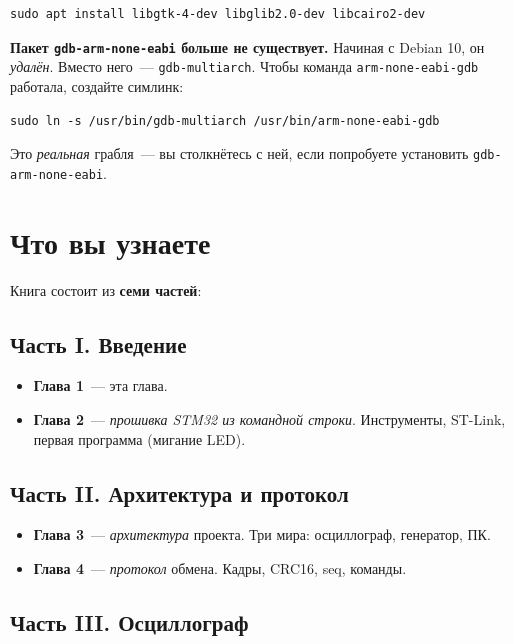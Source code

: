 \begin{verbatim}
sudo apt install libgtk-4-dev libglib2.0-dev libcairo2-dev
\end{verbatim}

\begin{warnbox}
\textbf{Пакет \texttt{gdb-arm-none-eabi} больше не существует.}
Начиная с Debian 10, он \emph{удалён}. Вместо него~---
\texttt{gdb-multiarch}. Чтобы команда \texttt{arm-none-eabi-gdb}
работала, создайте симлинк:
\begin{verbatim}
sudo ln -s /usr/bin/gdb-multiarch /usr/bin/arm-none-eabi-gdb
\end{verbatim}
Это \emph{реальная} грабля~--- вы столкнётесь с ней, если
попробуете установить \texttt{gdb-arm-none-eabi}.
\end{warnbox}

\section{Что вы узнаете}
\label{sec:intro-structure}

Книга состоит из \textbf{семи частей}:

\subsection{Часть I. Введение}

\begin{itemize}
    \item \textbf{Глава 1}~--- эта глава.
    \item \textbf{Глава 2}~--- \emph{прошивка STM32 из
          командной строки}. Инструменты, ST-Link,
          первая программа (мигание LED).
\end{itemize}

\subsection{Часть II. Архитектура и протокол}

\begin{itemize}
    \item \textbf{Глава 3}~--- \emph{архитектура} проекта.
          Три мира: осциллограф, генератор, ПК.
    \item \textbf{Глава 4}~--- \emph{протокол} обмена.
          Кадры, CRC16, seq, команды.
\end{itemize}

\subsection{Часть III. Осциллограф}

